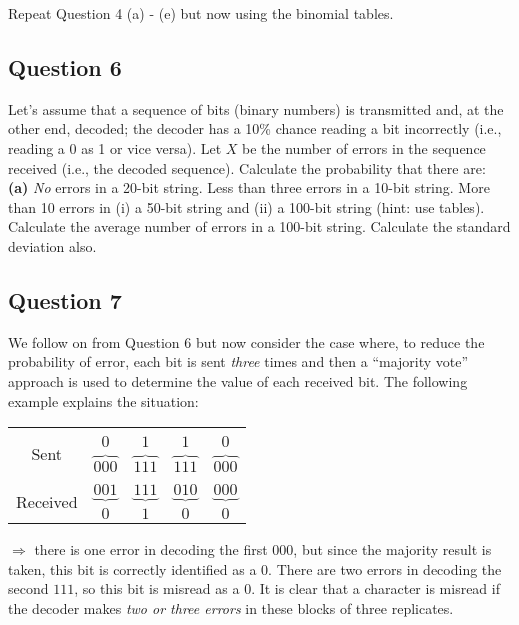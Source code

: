 \documentclass[12pt]{article}
\begin{document}
Repeat Question 4 (a) - (e) but now using the binomial tables.



\subsection*{Question 6}

Let's assume that a sequence of bits (binary numbers) is transmitted and, at the other end, decoded; the decoder has a 10\% chance reading a bit incorrectly (i.e., reading a 0 as 1 or vice versa). Let $X$ be the number of errors in the sequence received (i.e., the decoded sequence). Calculate the probability that there are: \\[-0.2cm]

{\bf(a)} \emph{No} errors in a 20-bit string.  Less than three errors in a 10-bit string.  More than 10 errors in (i) a 50-bit string and (ii) a 100-bit string (hint: use tables).  Calculate the average number of errors in a 100-bit string. Calculate the standard deviation also.


\subsection*{Question 7}
We follow on from Question 6 but now consider the case where, to reduce the probability of error, each bit is sent \emph{three} times and then a ``majority vote'' approach is used to determine the value of each received bit. The following example explains the situation:\\[-0.5cm]
\begin{center}
\begin{tabular}{ccccc}
\hline
&&&&\\[-0.3cm]
\multirow{2}{*}{Sent} & $0$ & $1$ & $1$ & $0$ \\
& $\overbrace{000}$ & $\overbrace{111}$ & $\overbrace{111}$ & $\overbrace{000}$ \\[0.2cm]
\hline
&&&&\\[-0.3cm]
\multirow{2}{*}{Received} & $\underbrace{001}$ & $\underbrace{111}$ & $\underbrace{010}$ & $\underbrace{000}$ \\
 & $0$ & $1$ & $0$ & $0$ \\[0.2cm]
\hline
\end{tabular}
\end{center}
$\Rightarrow$ there is one error in decoding the first $000$, but since the majority result is taken, this bit is correctly identified as a $0$. There are two errors in decoding the second $111$, so this bit is misread as a $0$. It is clear that a character is misread if the decoder makes \emph{two or three errors} in these blocks of three replicates.\\[-0.2cm]
\end{document}
